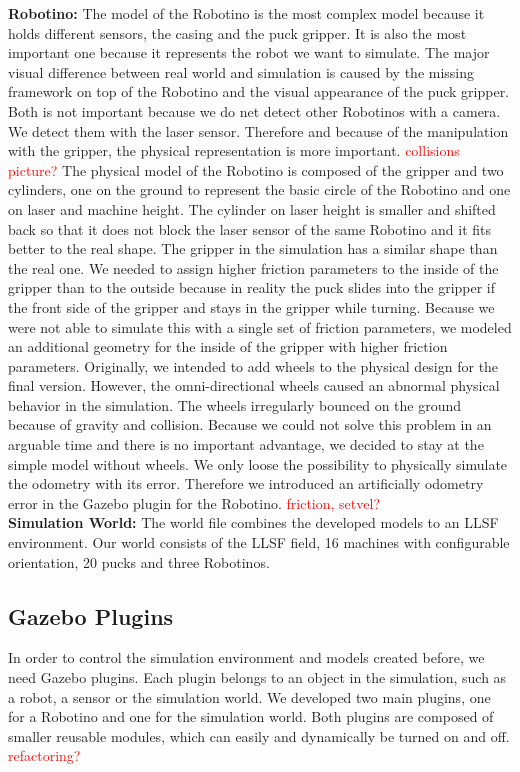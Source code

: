 \textbf{Robotino:} The model of the Robotino is the most complex model because it holds different sensors, the casing and the puck gripper. It is also the most important one because it represents the robot we want to simulate. The major visual difference between real world and simulation is caused by the missing framework on top of the Robotino and the visual appearance of the puck gripper. Both is not important because we do net detect other Robotinos with a camera. We detect them with the laser sensor. Therefore and because of the manipulation with the gripper, the physical representation is more important. \textcolor{red}{collisions picture?} The physical model of the Robotino is composed of the gripper and two cylinders, one on the ground to represent the basic circle of the Robotino and one on laser and machine height. The cylinder on laser height is smaller and shifted back so that it does not block the laser sensor of the same Robotino and it fits better to the real shape. The gripper in the simulation has a similar shape than the real one. We needed to assign higher friction parameters to the inside of the gripper than to the outside because in reality the puck slides into the gripper if the front side of the gripper and stays in the gripper while turning. Because we were not able to simulate this with a single set of friction parameters, we modeled an additional geometry for the inside of the gripper with higher friction parameters. Originally, we intended to add wheels to the physical design for the final version. However, the omni-directional wheels caused an abnormal physical behavior in the simulation. The wheels irregularly bounced on the ground because of gravity and collision. Because we could not solve this problem in an arguable time and there is no important advantage, we decided to stay at the simple model without wheels. We only loose the possibility to physically simulate the odometry with its error. Therefore we introduced an artificially odometry error in the Gazebo plugin for the Robotino. \textcolor{red}{friction, setvel?}\\
\textbf{Simulation World:} The world file combines the developed models to an LLSF environment. Our world consists of the LLSF field, 16 machines with configurable orientation, 20 pucks and three Robotinos.\\


\subsection{Gazebo Plugins}
In order to control the simulation environment and models created before, we need Gazebo plugins. Each plugin belongs to an object in the simulation, such as a robot, a sensor or the simulation world. We developed two main plugins, one for a Robotino and one for the simulation world. Both plugins are composed of smaller reusable modules, which can easily and dynamically be turned on and off. \textcolor{red}{refactoring?}

